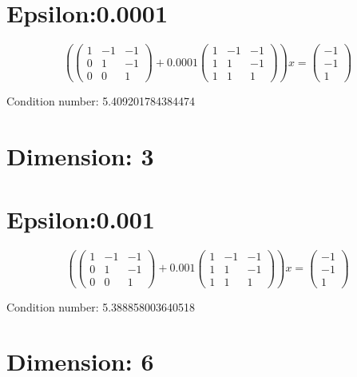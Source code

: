 \documentclass{article}%
\begin{document}
\section{Epsilon:0.0001}%
\label{sec:Epsilon0.0001}%
\[%
( \begin{pmatrix}%
1&-1&-1\\%
0&1&-1\\%
0&0&1%
\end{pmatrix} + 0.0001 \begin{pmatrix}%
1&-1&-1\\%
1&1&-1\\%
1&1&1%
\end{pmatrix} )x = \begin{pmatrix}%
-1\\%
-1\\%
1%
\end{pmatrix}%
\]%
\begin{Large}%
Condition number:%
5.409201784384474%
\end{Large}

%
\section{Dimension: 3}%
\label{sec:Dimension3}%
\section{Epsilon:0.001}%
\label{sec:Epsilon0.001}%
\[%
( \begin{pmatrix}%
1&-1&-1\\%
0&1&-1\\%
0&0&1%
\end{pmatrix} + 0.001 \begin{pmatrix}%
1&-1&-1\\%
1&1&-1\\%
1&1&1%
\end{pmatrix} )x = \begin{pmatrix}%
-1\\%
-1\\%
1%
\end{pmatrix}%
\]%
\begin{Large}%
Condition number:%
5.388858003640518%
\end{Large}

%
\section{Dimension: 6}%
\label{sec:Dimension6}%
\end{document}
